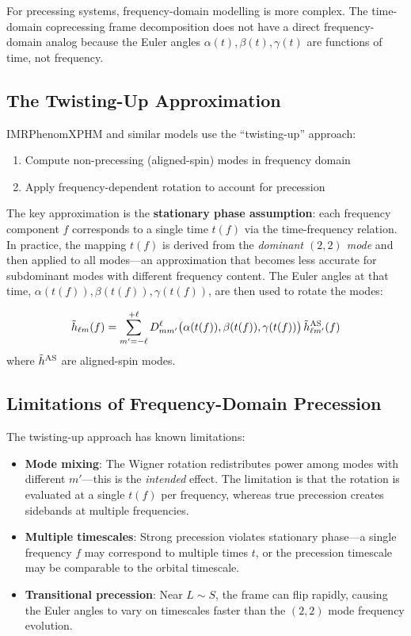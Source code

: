 \documentclass[11pt,a4paper]{article}
\newcommand{\htlm}{\tilde{h}_{\ell m}}
\begin{document}
For precessing systems, frequency-domain modelling is more complex. The time-domain coprecessing frame decomposition does not have a direct frequency-domain analog because the Euler angles $\alpha(t), \beta(t), \gamma(t)$ are functions of time, not frequency.

\subsection{The Twisting-Up Approximation}

IMRPhenomXPHM and similar models use the ``twisting-up'' approach:

\begin{enumerate}
    \item Compute non-precessing (aligned-spin) modes in frequency domain
    \item Apply frequency-dependent rotation to account for precession
\end{enumerate}

The key approximation is the \textbf{stationary phase assumption}: each frequency component $f$ corresponds to a single time $t(f)$ via the time-frequency relation. In practice, the mapping $t(f)$ is derived from the \emph{dominant $(2,2)$ mode} and then applied to all modes---an approximation that becomes less accurate for subdominant modes with different frequency content. The Euler angles at that time, $\alpha(t(f)), \beta(t(f)), \gamma(t(f))$, are then used to rotate the modes:

\begin{equation}
    \htlm(f) = \sum_{m'=-\ell}^{+\ell} D^\ell_{mm'}\bigl(\alpha(t(f)), \beta(t(f)), \gamma(t(f))\bigr) \, \tilde{h}^{\rm AS}_{\ell m'}(f)
\end{equation}
where $\tilde{h}^{\rm AS}$ are aligned-spin modes.

\subsection{Limitations of Frequency-Domain Precession}

The twisting-up approach has known limitations:
\begin{itemize}
    \item \textbf{Mode mixing}: The Wigner rotation redistributes power among modes with different $m'$---this is the \emph{intended} effect. The limitation is that the rotation is evaluated at a single $t(f)$ per frequency, whereas true precession creates sidebands at multiple frequencies.
    \item \textbf{Multiple timescales}: Strong precession violates stationary phase---a single frequency $f$ may correspond to multiple times $t$, or the precession timescale may be comparable to the orbital timescale.
    \item \textbf{Transitional precession}: Near $L \sim S$, the frame can flip rapidly, causing the Euler angles to vary on timescales faster than the $(2,2)$ mode frequency evolution.
\end{itemize}
\end{document}
